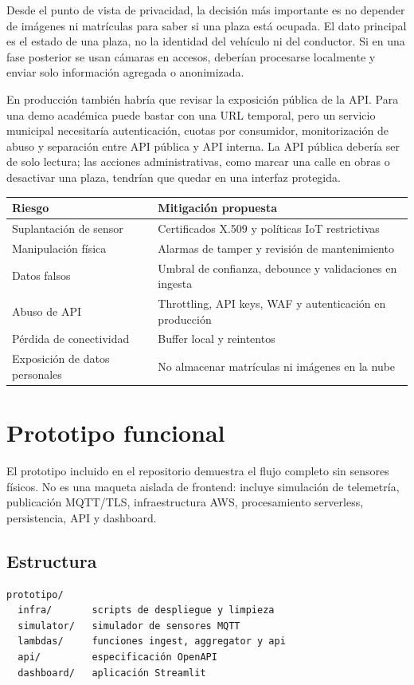 \documentclass[11pt,a4paper]{article}
\begin{document}
Desde el punto de vista de privacidad, la decisión más importante es no depender de imágenes ni matrículas para saber si una plaza está ocupada. El dato principal es el estado de una plaza, no la identidad del vehículo ni del conductor. Si en una fase posterior se usan cámaras en accesos, deberían procesarse localmente y enviar solo información agregada o anonimizada.

En producción también habría que revisar la exposición pública de la API. Para una demo académica puede bastar con una URL temporal, pero un servicio municipal necesitaría autenticación, cuotas por consumidor, monitorización de abuso y separación entre API pública y API interna. La API pública debería ser de solo lectura; las acciones administrativas, como marcar una calle en obras o desactivar una plaza, tendrían que quedar en una interfaz protegida.

\begin{longtable}{P{5cm}P{9.7cm}}
\toprule
\textbf{Riesgo} & \textbf{Mitigación propuesta} \\
\midrule
\endhead
Suplantación de sensor & Certificados X.509 y políticas IoT restrictivas \\
Manipulación física & Alarmas de tamper y revisión de mantenimiento \\
Datos falsos & Umbral de confianza, debounce y validaciones en ingesta \\
Abuso de API & Throttling, API keys, WAF y autenticación en producción \\
Pérdida de conectividad & Buffer local y reintentos \\
Exposición de datos personales & No almacenar matrículas ni imágenes en la nube \\
\bottomrule
\end{longtable}

\section{Prototipo funcional}

El prototipo incluido en el repositorio demuestra el flujo completo sin sensores físicos. No es una maqueta aislada de frontend: incluye simulación de telemetría, publicación MQTT/TLS, infraestructura AWS, procesamiento serverless, persistencia, API y dashboard.

\subsection{Estructura}
\begin{lstlisting}
prototipo/
  infra/       scripts de despliegue y limpieza
  simulator/   simulador de sensores MQTT
  lambdas/     funciones ingest, aggregator y api
  api/         especificación OpenAPI
  dashboard/   aplicación Streamlit
\end{lstlisting}
\end{document}
